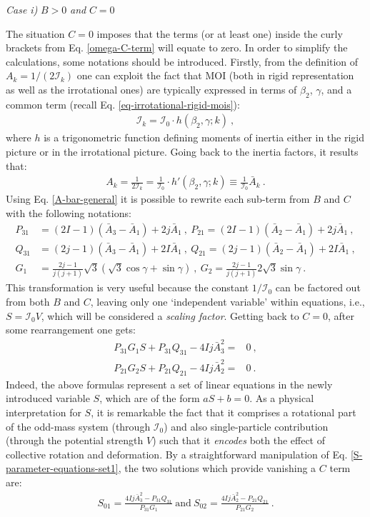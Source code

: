 \textit{Case i)} $B>0$ \textit{and} $C=0$

The situation $C=0$ imposes that the terms (or at least one) inside the curly brackets from Eq. \ref{omega-C-term} will equate to zero. In order to simplify the calculations, some notations should be introduced. Firstly, from the definition of $A_k=1/(2\mathcal{I}_k)$ one can exploit the fact that MOI (both in rigid representation as well as the irrotational ones) are typically expressed in terms of $\beta_2$, $\gamma$, and a common term (recall Eq. \ref{eq-irrotational-rigid-mois}):
\begin{align}
    \mathcal{I}_k=\mathcal{I}_0\cdot h(\beta_2,\gamma;k)\ ,
\end{align}
where $h$ is a trigonometric function defining moments of inertia either in the rigid picture or in the irrotational picture. Going back to the inertia factors, it results that:
\begin{align}
    A_k=\frac{1}{2\mathcal{I}_k}=\frac{1}{\mathcal{I}_0}\cdot h'(\beta_2,\gamma;k)\equiv\frac{1}{\mathcal{I}_0}\bar{A}_k\ .
    \label{A-bar-general}
\end{align}
Using Eq. \ref{A-bar-general} it is possible to rewrite each sub-term from $B$ and $C$ with the following notations:
\begin{align}
    P_{31}&=(2I-1)(\bar{A}_3-\bar{A}_1)+2j\bar{A}_1\ ,\ P_{21}=(2I-1)(\bar{A}_2-\bar{A}_1)+2j\bar{A}_1\ , \nonumber\\
    Q_{31}&=(2j-1)(\bar{A}_3-\bar{A}_1)+2I\bar{A}_1\ ,\ Q_{21}=(2j-1)(\bar{A}_2-\bar{A}_1)+2I\bar{A}_1\ ,\nonumber\\
    G_1&=\frac{2j-1}{j(j+1)}\sqrt{3}\left(\sqrt{3}\cos\gamma+\sin\gamma\right)\ ,\ G_2=\frac{2j-1}{j(j+1)}2\sqrt{3}\sin\gamma\ .
    \label{P-Q-G1-G2-factors}
\end{align}
This transformation is very useful because the constant $1/\mathcal{I}_0$ can be factored out from both $B$ and $C$, leaving only one `independent variable' within equations, i.e., $S=\mathcal{I}_0V$, which will be considered a \emph{scaling factor}. Getting back to $C=0$, after some rearrangement one gets:
\begin{align}
    P_{31}G_1S+P_{31}Q_{31}-4Ij\bar{A}_3^2=&0\ ,\nonumber\\
    P_{21}G_2S+P_{21}Q_{21}-4Ij\bar{A}_2^2=&0\ .
    \label{S-parameter-equations-set1}
\end{align}
Indeed, the above formulas represent a set of linear equations in the newly introduced variable $S$, which are of the form $aS+b=0$. As a physical interpretation for $S$, it is remarkable the fact that it comprises a rotational part of the odd-mass system (through $\mathcal{I}_0$) and also single-particle contribution (through the potential strength $V$) such that it \emph{encodes} both the effect of collective rotation and deformation. By a straightforward manipulation of Eq. \ref{S-parameter-equations-set1}, the two solutions which provide vanishing a $C$ term are:
\begin{align}
    S_{01}=\frac{4Ij\bar{A}_3^2-P_{31}Q_{31}}{P_{31}G_1}\ \text{and}\ S_{02}=\frac{4Ij\bar{A}_2^2-P_{21}Q_{21}}{P_{21}G_2}\ .
    \label{C-Term-zero-solutions}
\end{align}

